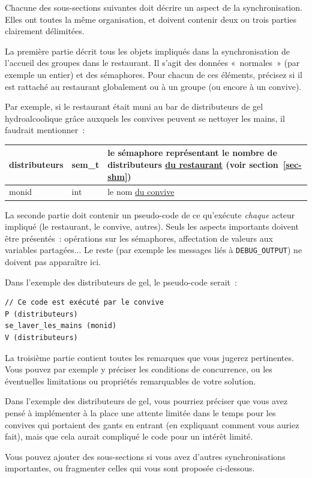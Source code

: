 \documentclass[a4paper]{article}
\makeatletter
\newenvironment{expl}{%
  \begin{list}{}{%
      \small\itshape%
      \topsep\z@%
      \listparindent0pt%
      \parsep0.75\baselineskip%
      \setlength{\leftmargin}{20mm}%
      \setlength{\rightmargin}{20mm}%
    }
  \item[]}%
  {\end{list}}
\makeatother
\begin{document}
\begin{expl}
  Chacune des sous-sections suivantes doit décrire un aspect de la
  synchronisation. Elles ont toutes la même organisation, et doivent
  contenir deux ou trois parties clairement délimitées.

  La première partie décrit tous les objets impliqués dans la
  synchronisation de l'accueil des groupes dans le restaurant. Il
  s'agit des données «~normales~» (par exemple un entier) et des
  sémaphores. Pour chacun de ces éléments, précisez si il est rattaché
  au restaurant globalement ou à un groupe (ou encore à un convive).

  Par exemple, si le restaurant était muni au bar de distributeurs de
  gel hydroalcoolique grâce auxquels les convives peuvent se nettoyer les
  mains, il faudrait mentionner~:

  \begin{tabularx}{\linewidth}{|l|l|X|}
    \hline
    distributeurs & sem\_t & le sémaphore représentant le nombre de
    distributeurs \underline{du restaurant} (voir section~\ref{sec-shm})
    \\ \hline
    monid & int & le nom \underline{du convive}
    \\ \hline
  \end{tabularx}

  La seconde partie doit contenir un pseudo-code de ce qu'exécute
  \emph{chaque} acteur impliqué (le restaurant, le convive, autres).
  Seuls les aspects importants doivent être présentés~: opérations sur
  les sémaphores, affectation de valeurs aux variables
  partagées... Le reste (par exemple les messages liés à
  \texttt{DEBUG\_OUTPUT}) ne doivent pas apparaître ici.

  Dans l'exemple des distributeurs de gel, le pseudo-code serait~:

\begin{verbatim}
// Ce code est exécuté par le convive
P (distributeurs)
se_laver_les_mains (monid)
V (distributeurs)
\end{verbatim}

  La troisième partie contient toutes les remarques que vous jugerez
  pertinentes. Vous pouvez par exemple y préciser les conditions de
  concurrence, ou les éventuelles limitations ou propriétés
  remarquables de votre solution.

  Dans l'exemple des distributeurs de gel, vous pourriez préciser que
  vous avez pensé à implémenter à la place une attente limitée dans le
  temps pour les convives qui portaient des gants en entrant (en
  expliquant comment vous auriez fait), mais que cela aurait compliqué
  le code pour un intérêt limité.

  Vous pouvez ajouter des sous-sections si vous avez d'autres
  synchronisations importantes, ou fragmenter celles qui vous sont
  proposée ci-dessous.
\end{expl}
\end{document}
